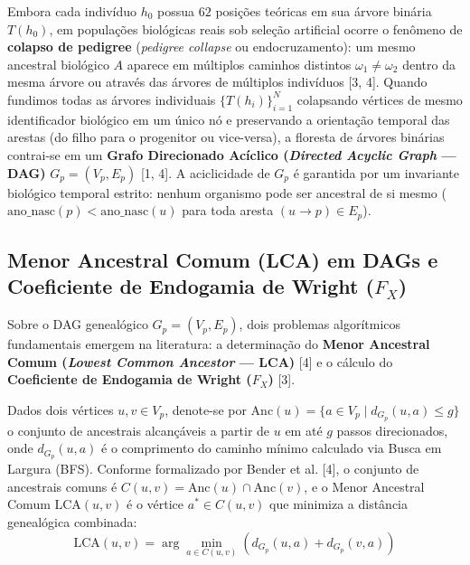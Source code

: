 \documentclass[conference]{IEEEtran}
\begin{document}
Embora cada indivíduo $h_0$ possua $62$ posições teóricas em sua árvore binária $T(h_0)$, em populações biológicas reais sob seleção artificial ocorre o fenômeno de \textbf{colapso de pedigree} (\textit{pedigree collapse} ou endocruzamento): um mesmo ancestral biológico $A$ aparece em múltiplos caminhos distintos $\omega_1 \neq \omega_2$ dentro da mesma árvore ou através das árvores de múltiplos indivíduos [3, 4]. Quando fundimos todas as árvores individuais $\{T(h_i)\}_{i=1}^{N}$ colapsando vértices de mesmo identificador biológico em um único nó e preservando a orientação temporal das arestas (do filho para o progenitor ou vice-versa), a floresta de árvores binárias contrai-se em um \textbf{Grafo Direcionado Acíclico (\textit{Directed Acyclic Graph} --- DAG)} $G_p = (V_p, E_p)$ [1, 4]. A aciclicidade de $G_p$ é garantida por um invariante biológico temporal estrito: nenhum organismo pode ser ancestral de si mesmo ($\text{ano\_nasc}(p) < \text{ano\_nasc}(u)$ para toda aresta $(u \to p) \in E_p$).

\subsection{Menor Ancestral Comum (LCA) em DAGs e Coeficiente de Endogamia de Wright ($F_X$)}
Sobre o DAG genealógico $G_p = (V_p, E_p)$, dois problemas algorítmicos fundamentais emergem na literatura: a determinação do \textbf{Menor Ancestral Comum (\textit{Lowest Common Ancestor} --- LCA)} [4] e o cálculo do \textbf{Coeficiente de Endogamia de Wright ($F_X$)} [3].

Dados dois vértices $u, v \in V_p$, denote-se por $\text{Anc}(u) = \{a \in V_p \mid d_{G_p}(u, a) \le g\}$ o conjunto de ancestrais alcançáveis a partir de $u$ em até $g$ passos direcionados, onde $d_{G_p}(u, a)$ é o comprimento do caminho mínimo calculado via Busca em Largura (BFS). Conforme formalizado por Bender et al. [4], o conjunto de ancestrais comuns é $C(u, v) = \text{Anc}(u) \cap \text{Anc}(v)$, e o Menor Ancestral Comum $\text{LCA}(u, v)$ é o vértice $a^* \in C(u, v)$ que minimiza a distância genealógica combinada:
\begin{equation}
    \text{LCA}(u, v) = \arg\min_{a \in C(u,v)} \left( d_{G_p}(u, a) + d_{G_p}(v, a) \right)
\end{equation}
\end{document}
